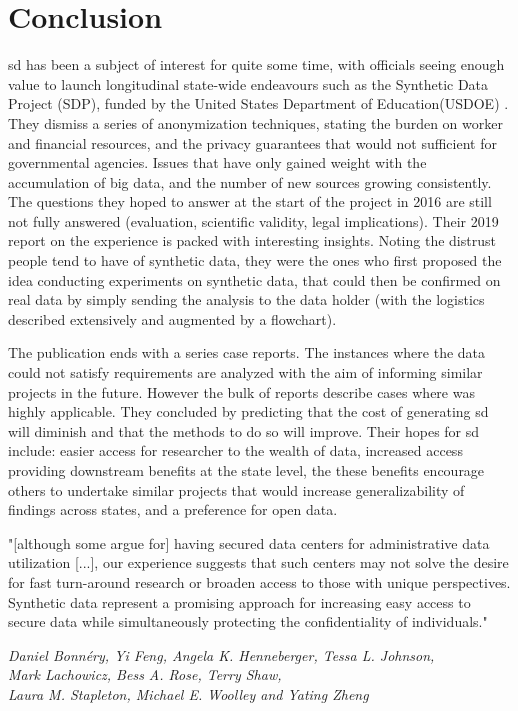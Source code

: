 \section{Conclusion}
\normalsize
\Gls{sd} has been a subject of interest for quite some time, with officials seeing enough value to launch longitudinal state-wide endeavours such as the Synthetic Data Project (SDP), funded by the United States Department of Education(USDOE) \cite{Bonnery2019-ug}. They dismiss a series of anonymization techniques, stating the burden on worker and financial resources, and the privacy guarantees that would not sufficient for governmental agencies. Issues that have only gained weight with the accumulation of big data, and the number of new sources growing consistently. The questions they hoped to answer at the start of the project in 2016 are still not fully answered (evaluation, scientific validity, legal implications). Their 2019 report on the experience is packed with interesting insights. Noting the distrust people tend to have of synthetic data, they were the ones who first proposed the idea conducting experiments on synthetic data, that could then be confirmed on real data by simply sending the analysis to the data holder (with the logistics described extensively and augmented by a flowchart).\par

The publication ends with a series case reports. The instances where the data could not satisfy requirements are analyzed with the aim of informing similar projects in the future. However the bulk of reports describe cases where was highly applicable. They concluded by predicting that the cost of generating \gls{sd} will diminish and that the methods to do so will improve. Their hopes for \gls{sd} include: easier access for researcher to the wealth of data, increased access providing downstream benefits at the state level, the these benefits encourage others to undertake similar projects that would increase generalizability of findings across states, and a preference for open data.

\renewcommand{\epigraphsize}{\footnotesize}
\setlength{\epigraphwidth}{12cm}
\epigraph{
    "[although some argue for] having secured data centers for administrative data utilization [...], our experience suggests that such centers may not solve the desire for fast turn-around research or broaden access to those with unique perspectives. Synthetic data represent a promising approach for increasing easy access to secure data while simultaneously protecting the confidentiality of individuals."}{\textit{Daniel Bonnéry, Yi Feng, Angela K. Henneberger, Tessa L. Johnson,\\ Mark Lachowicz, Bess A. Rose, Terry Shaw,\\ Laura M. Stapleton, Michael E. Woolley and Yating Zheng}}
    
